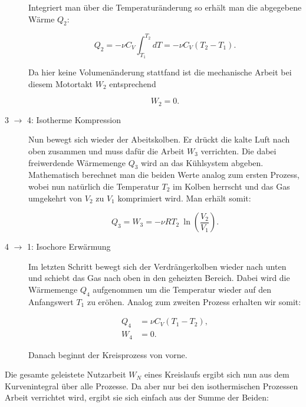 \documentclass{article}
\begin{document}
\begin{description}
   Integriert man über die Temperaturänderung so erhält man die abgegebene Wärme $Q_2$:

   \begin{equation}
       Q_2 = - \nu C_V \int_{T_1}^{T_2} dT = - \nu C_V (T_2 - T_1).
   \end{equation}

   Da hier keine Volumenänderung stattfand ist die mechanische Arbeit bei diesem Motortakt $W_2$ entsprechend 

   \begin{equation}
       W_2 = 0.
   \end{equation}

   \phantom{.}

   \item[3 $\xrightarrow{}$ 4: Isotherme Kompression] Nun bewegt sich wieder der Abeitskolben. Er drückt die kalte Luft nach oben zusammen und muss dafür die Arbeit $W_3$ verrichten. Die dabei freiwerdende Wärmemenge $Q_3$ wird an das Kühlsystem abgeben. Mathematisch berechnet man die beiden Werte analog zum ersten Prozess, wobei nun natürlich die Temperatur $T_2$ im Kolben herrscht und das Gas umgekehrt von $V_2$ zu $V_1$ komprimiert wird. Man erhält somit:

   \begin{equation}
       Q_3 = W_3 = - \nu R T_2 \ \ln{\left( \frac{V_2}{V_1} \right)}.
   \end{equation}

   \phantom{.}
   \item[4 $\xrightarrow{}$ 1: Isochore Erwärmung] Im letzten Schritt bewegt sich der Verdrängerkolben wieder nach unten und schiebt das Gas nach oben in den geheizten Bereich. Dabei wird die Wärmemenge $Q_4$ aufgenommen um die Temperatur wieder auf den Anfangswert $T_1$ zu eröhen. Analog zum zweiten Prozess erhalten wir somit:

   \begin{equation}
       \begin{split}
           Q_4 &= \nu C_V (T_1 - T_2), \\
           W_4 &= 0.
       \end{split}
   \end{equation}

   Danach beginnt der Kreisprozess von vorne.
\end{description}

Die gesamte geleistete Nutzarbeit $W_N$ eines Kreislaufs ergibt sich nun aus dem Kurvenintegral über alle Prozesse. Da aber nur bei den isothermischen Prozessen Arbeit verrichtet wird, ergibt sie sich einfach aus der Summe der Beiden:
\end{document}
